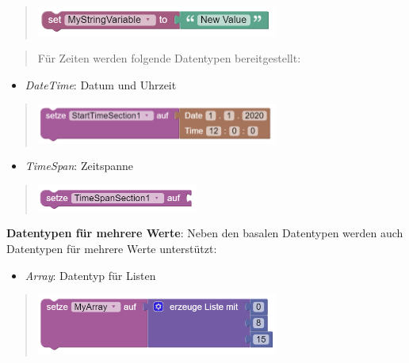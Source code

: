 \documentclass[
  letterpaper,
  DIV=11]{scrreprt}
\providecommand{\tightlist}{%
  \setlength{\itemsep}{0pt}\setlength{\parskip}{0pt}}\usepackage{longtable,booktabs,array}
\begin{document}
\begin{tcolorbox}
\begin{quote}
\includegraphics[width=3.125in,height=\textheight]{img/screenshot-blockly-assignment-string-01-ENG.png}
\end{quote}

\begin{quote}
Für Zeiten werden folgende Datentypen bereitgestellt:
\end{quote}

\begin{itemize}
\tightlist
\item
  \emph{DateTime}: Datum und Uhrzeit
\end{itemize}

\begin{quote}
\includegraphics[width=3.125in,height=\textheight]{img/screenshot-blockly-assignment-datetime-01-DEU.png}
\end{quote}

\begin{itemize}
\tightlist
\item
  \emph{TimeSpan}: Zeitspanne
\end{itemize}

\begin{quote}
\includegraphics[width=2.08333in,height=\textheight]{img/screenshot-blockly-assignment-timespan-01-DEU.png}
\end{quote}

\textbf{Datentypen für mehrere Werte}: Neben den basalen Datentypen
werden auch Datentypen für mehrere Werte unterstützt:

\begin{itemize}
\tightlist
\item
  \emph{Array}: Datentyp für Listen
\end{itemize}

\begin{quote}
\includegraphics[width=3.125in,height=\textheight]{img/screenshot-blockly-assignment-array-example-01-DEU.png}
\end{quote}


\end{tcolorbox}
\end{document}
